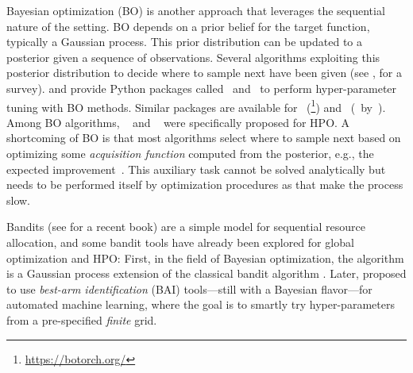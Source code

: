 Bayesian optimization (BO) is another approach that leverages the sequential nature of the setting. BO depends on a prior belief for the target function, typically a Gaussian process. This prior distribution can be updated to a posterior given a sequence of observations. Several algorithms exploiting this posterior distribution to decide where to sample next have been given (see  \citealp{shahriari2016loop}, for a survey). \citet{snoek2012spearmint} and \citet{klein2017robo} provide Python packages called \Spearmint\ and \RoBO\ to perform hyper-parameter tuning with BO methods. Similar packages are available for \PyTorch\ (\BoTorch\footnote{\url{https://botorch.org/}}) and \TensorFlow\ (\flow\ by~\citealt{knudde2017gpflowopt}). Among BO algorithms, \TPE~\citep{bergstra2011tpe} and \SMAC~\citep{hutter2011smac} were specifically proposed for HPO. A shortcoming of BO is that most algorithms select where to sample next based on optimizing some \emph{acquisition function} computed from the posterior, e.g., the expected improvement~\citep{jones1998ei}. This auxiliary  task cannot be solved analytically but needs to be performed itself by optimization procedures as \LBFGS that make the process slow. %

Bandits (see \citealp{lattimore2018bandits} for a recent book) are a simple model for sequential resource allocation, and some bandit tools have already been explored for global optimization and HPO: First, in the field of Bayesian optimization, the \GPUCB algorithm \citep{srinivas2010gpucb} is a Gaussian process extension of the classical \UCB bandit algorithm \citep{auer2002ucb}. Later, \citet{hoffman2014bayesgap} proposed to use \emph{best-arm identification} (BAI) tools---still with a Bayesian flavor---for automated machine learning, where the goal is to smartly try hyper-parameters from a pre-specified \emph{finite} grid. 

